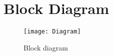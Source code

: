 \section{Block Diagram}



\begin{figure}[H]
    \centerline{\texttt{[image: Diagram]}}
    \vspace{0cm}\caption{Block diagram}
    \label{fig:Block Diagram}
\end{figure}

\clearpage


